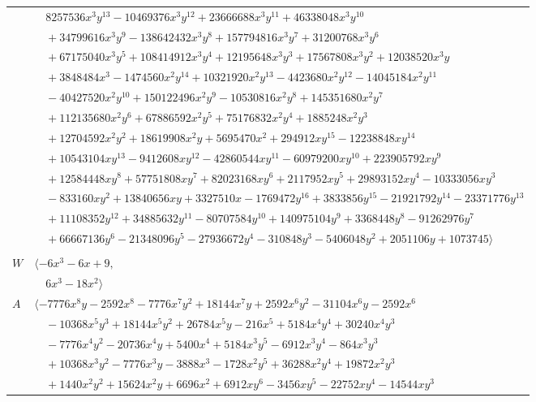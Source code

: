 \documentclass[11pt]{article}
\begin{document}
\begin{longtable}{@{}ll@{}}
 & $\quad 8257536x^{3}y^{13}-10469376x^{3}y^{12}+23666688x^{3}y^{11}+46338048x^{3}y^{10}$\\
 & $\quad +34799616x^{3}y^{9}-138642432x^{3}y^{8}+157794816x^{3}y^{7}+31200768x^{3}y^{6}$\\
 & $\quad +67175040x^{3}y^{5}+108414912x^{3}y^{4}+12195648x^{3}y^{3}+17567808x^{3}y^{2}+12038520x^{3}y$\\
 & $\quad +3848484x^{3}-1474560x^{2}y^{14}+10321920x^{2}y^{13}-4423680x^{2}y^{12}-14045184x^{2}y^{11}$\\
 & $\quad -40427520x^{2}y^{10}+150122496x^{2}y^{9}-10530816x^{2}y^{8}+145351680x^{2}y^{7}$\\
 & $\quad +112135680x^{2}y^{6}+67886592x^{2}y^{5}+75176832x^{2}y^{4}+1885248x^{2}y^{3}$\\
 & $\quad +12704592x^{2}y^{2}+18619908x^{2}y+5695470x^{2}+294912xy^{15}-12238848xy^{14}$\\
 & $\quad +10543104xy^{13}-9412608xy^{12}-42860544xy^{11}-60979200xy^{10}+223905792xy^{9}$\\
 & $\quad +12584448xy^{8}+57751808xy^{7}+82023168xy^{6}+2117952xy^{5}+29893152xy^{4}-10333056xy^{3}$\\
 & $\quad -833160xy^{2}+13840656xy+3327510x-1769472y^{16}+3833856y^{15}-21921792y^{14}-23371776y^{13}$\\
 & $\quad +11108352y^{12}+34885632y^{11}-80707584y^{10}+140975104y^{9}+3368448y^{8}-91262976y^{7}$\\
 & $\quad +66667136y^{6}-21348096y^{5}-27936672y^{4}-310848y^{3}-5406048y^{2}+2051106y+1073745\rangle$\\
\addlinespace[2pt]
\multicolumn{2}{@{}p{0.97\textwidth}@{}}{$i=5$, $D_i=6$, $\rho_{ij}$: $7{:}2, \allowbreak 15{:}1, \allowbreak 25{:}1, \allowbreak 29{:}1, \allowbreak 43{:}2, \allowbreak 44{:}2$}\\
$W$ & $\langle -6x^{3}-6x+9,$\\
 & $\quad 6x^{3}-18x^{2}\rangle$\\
$A$ & $\langle -7776x^{8}y-2592x^{8}-7776x^{7}y^{2}+18144x^{7}y+2592x^{6}y^{2}-31104x^{6}y-2592x^{6}$\\
 & $\quad -10368x^{5}y^{3}+18144x^{5}y^{2}+26784x^{5}y-216x^{5}+5184x^{4}y^{4}+30240x^{4}y^{3}$\\
 & $\quad -7776x^{4}y^{2}-20736x^{4}y+5400x^{4}+5184x^{3}y^{5}-6912x^{3}y^{4}-864x^{3}y^{3}$\\
 & $\quad +10368x^{3}y^{2}-7776x^{3}y-3888x^{3}-1728x^{2}y^{5}+36288x^{2}y^{4}+19872x^{2}y^{3}$\\
 & $\quad +1440x^{2}y^{2}+15624x^{2}y+6696x^{2}+6912xy^{6}-3456xy^{5}-22752xy^{4}-14544xy^{3}$\\

\end{longtable}
\end{document}

